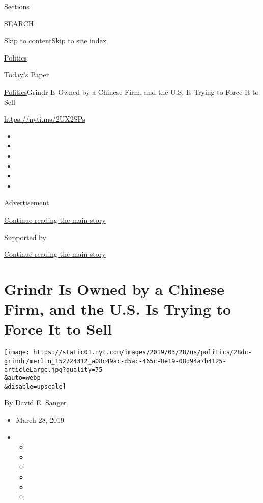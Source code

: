 Sections

SEARCH

\protect\hyperlink{site-content}{Skip to
content}\protect\hyperlink{site-index}{Skip to site index}

\href{https://www.nytimes.com/section/politics}{Politics}

\href{https://myaccount.nytimes.com/auth/login?response_type=cookie\&client_id=vi}{}

\href{https://www.nytimes.com/section/todayspaper}{Today's Paper}

\href{/section/politics}{Politics}\textbar{}Grindr Is Owned by a Chinese
Firm, and the U.S. Is Trying to Force It to Sell

\url{https://nyti.ms/2UX2SPs}

\begin{itemize}
\item
\item
\item
\item
\item
\item
\end{itemize}

Advertisement

\protect\hyperlink{after-top}{Continue reading the main story}

Supported by

\protect\hyperlink{after-sponsor}{Continue reading the main story}

\hypertarget{grindr-is-owned-by-a-chinese-firm-and-the-us-is-trying-to-force-it-to-sell}{%
\section{Grindr Is Owned by a Chinese Firm, and the U.S. Is Trying to
Force It to
Sell}\label{grindr-is-owned-by-a-chinese-firm-and-the-us-is-trying-to-force-it-to-sell}}

\texttt{[image: https://static01.nyt.com/images/2019/03/28/us/politics/28dc-grindr/merlin\_152724312\_a08c49ac-d5ac-465c-8e19-08d94a7b4125-articleLarge.jpg?quality=75\\\&auto=webp\\\&disable=upscale]}

By \href{https://www.nytimes.com/by/david-e-sanger}{David E. Sanger}

\begin{itemize}
\item
  March 28, 2019
\item
  \begin{itemize}
  \item
  \item
  \item
  \item
  \item
  \item
  \end{itemize}
\end{itemize}


